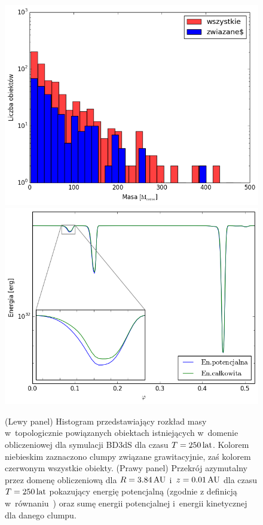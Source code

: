 \begin{figure}
   \centering
   \includegraphics[width=0.49\linewidth]{figures/masshist.png}
   \includegraphics[width=0.49\linewidth]{figures/energie.png}
   \caption{(Lewy panel) Histogram przedstawiający rozkład masy w~topologicznie powiązanych
   obiektach istniejących w~domenie obliczeniowej dla symulacji BD3dS dla czasu
   $T=250\hbox{$\thinspace\textrm{lat}$}$. Kolorem niebieskim zaznaczono clumpy związane grawitacyjnie, zaś
   kolorem czerwonym wszystkie obiekty.
   (Prawy panel) Przekrój azymutalny przez domenę obliczeniową dla $R=3.84\hbox{$\thinspace\textrm{AU}$}$
   i~$z=0.01\hbox{$\thinspace\textrm{AU}$}$ dla czasu $T=250\hbox{$\thinspace\textrm{lat}$}$ pokazujący energię potencjalną (zgodnie z
   definicją w~równaniu~) oraz sumę energii potencjalnej i~energii
   kinetycznej dla danego clumpu.}
   \label{fig:masshist}
\end{figure}
%
